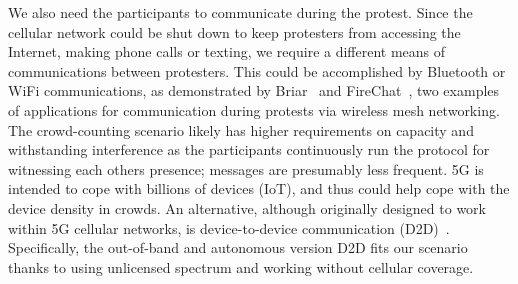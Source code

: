 We also need the participants to communicate during the protest.
Since the cellular network could be shut down to keep protesters from accessing 
the Internet, making phone calls or texting, we require a different means of 
communications between protesters. This could be accomplished by Bluetooth or 
WiFi communications, as demonstrated by Briar~\cite{Briar} and 
FireChat~\cite{FireChat}, two examples of applications for communication during 
protests via wireless mesh networking. The crowd-counting scenario likely has 
higher requirements on capacity and withstanding interference as the 
participants continuously run the protocol for witnessing each others presence; 
messages are presumably less frequent. 5G is intended to cope with billions of 
devices (IoT), and thus could help cope with the device density in crowds.
An alternative, although originally designed to work within 5G cellular networks, is device-to-device communication (D2D)~\cite{D2D}. 
Specifically, the out-of-band and autonomous version D2D fits our scenario thanks to using unlicensed spectrum and working without cellular coverage. 
